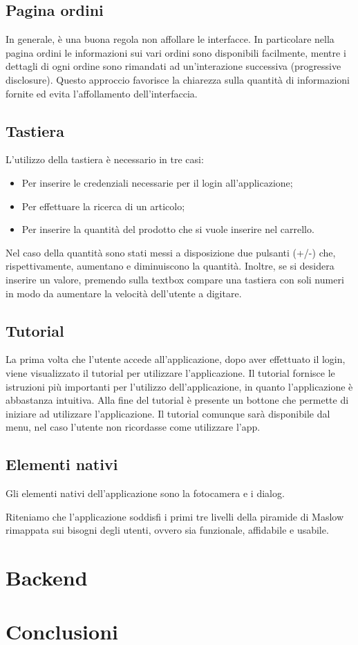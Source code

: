 \documentclass[12pt, a4paper, titlepage]{report}
\begin{document}
	\subsection{Pagina ordini}
	In generale, è una buona regola non affollare le interfacce. In particolare nella pagina ordini le informazioni sui vari ordini sono disponibili facilmente, mentre i dettagli di ogni ordine sono rimandati ad un'interazione successiva (progressive disclosure). Questo approccio favorisce la chiarezza sulla quantità di informazioni fornite ed evita l'affollamento dell'interfaccia.
	
	\subsection{Tastiera}
	L'utilizzo della tastiera è necessario in tre casi:
	\begin{itemize}
		\item Per inserire le credenziali necessarie per il login all'applicazione;
		\item Per effettuare la ricerca di un articolo;
		\item Per inserire la quantità del prodotto che si vuole inserire nel carrello.
	\end{itemize}
	Nel caso della quantità sono stati messi a disposizione due pulsanti (+/-) che, rispettivamente, aumentano e diminuiscono la quantità. Inoltre, se si desidera inserire un valore, premendo sulla textbox compare una tastiera con soli numeri in modo da aumentare la velocità dell'utente a digitare.
	
	\subsection{Tutorial}
	La prima volta che l'utente accede all'applicazione, dopo aver effettuato il login, viene visualizzato il tutorial per utilizzare l'applicazione. Il tutorial fornisce le istruzioni più importanti per l'utilizzo dell'applicazione, in quanto l'applicazione è abbastanza intuitiva. Alla fine del tutorial è presente un bottone che permette di iniziare ad utilizzare l'applicazione. Il tutorial comunque sarà disponibile dal menu, nel caso l'utente non ricordasse come utilizzare l'app.
	
	\subsection{Elementi nativi}
	Gli elementi nativi dell'applicazione sono la fotocamera e i dialog.
	
	Riteniamo che l'applicazione soddisfi i primi tre livelli della piramide di Maslow rimappata sui bisogni degli utenti, ovvero sia funzionale, affidabile e usabile.
	
	\section{Backend}
	
	\section{Conclusioni}
\end{document}
